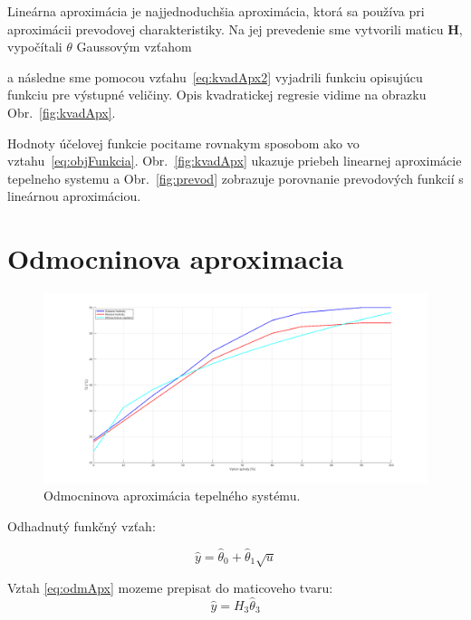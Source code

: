 \documentclass{article}
\begin{document}
Lineárna aproximácia je najjednoduchšia aproximácia, ktorá sa používa pri aproximácii prevodovej
charakteristiky. Na jej prevedenie sme vytvorili maticu \textbf{H}, vypočítali
\(\theta\) Gaussovým vzťahom

a následne sme pomocou vzťahu~\ref{eq:kvadApx2} vyjadrili funkciu opisujúcu funkciu pre výstupné
veličiny. Opis kvadratickej regresie vidime na obrazku Obr.~\ref{fig:kvadApx}.

Hodnoty účelovej funkcie pocitame rovnakym sposobom ako vo vztahu~\ref{eq:objFunkcia}.
Obr.~\ref{fig:kvadApx} ukazuje priebeh linearnej aproximácie tepelneho systemu a
Obr.~\ref{fig:prevod} zobrazuje porovnanie prevodových funkcií s lineárnou aproximáciou.

\clearpage

\section{Odmocninova aproximacia}
\label{sec:odm}

\begin{figure}[!htbp]
	\begin{center}
		\includegraphics[width=\textwidth]{include/odmocninova_regresia.png}
	\end{center}
	\caption{Odmocninova aproximácia tepelného systému.}
	\label{fig:odmApx}
\end{figure}

Odhadnutý funkčný vzťah:

\begin{equation}
	\hat{y} = \hat{\theta}_0 + \hat{\theta}_1 \sqrt{u}
	\label{eq:odmApx}
\end{equation}

Vztah \ref{eq:odmApx} mozeme prepisat do maticoveho tvaru:
\begin{equation}
	\hat{y} = H_3\hat{\theta}_3
	\label{eq:odmApx2}
\end{equation}
\end{document}
